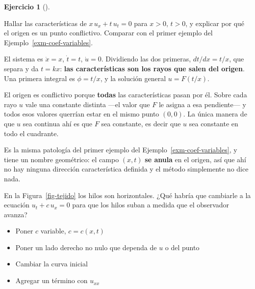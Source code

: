 \documentclass[
  spanish,
  a4paper,
]{scrbook}
\providecommand{\tightlist}{%
  \setlength{\itemsep}{0pt}\setlength{\parskip}{0pt}}
\theoremstyle{definition}
\theoremstyle{plain}
\theoremstyle{definition}
\theoremstyle{plain}
\theoremstyle{definition}
\newtheorem{exercise}{Ejercicio}[chapter]
\theoremstyle{remark}
\begin{document}
\begin{exercise}[]\protect\hypertarget{exr-caracteristicas-variables}{}\label{exr-caracteristicas-variables}

Hallar las características de \(x\,u_x + t\,u_t = 0\) para \(x>0\),
\(t>0\), y explicar por qué el origen es un punto conflictivo. Comparar
con el primer ejemplo del Ejemplo~\ref{exm-coef-variables}.

\end{exercise}

\begin{tcolorbox}[enhanced jigsaw, arc=.35mm, bottomrule=.15mm, bottomtitle=1mm, breakable, colback=white, colbacktitle=quarto-callout-tip-color!10!white, colframe=quarto-callout-tip-color-frame, coltitle=black, left=2mm, leftrule=.75mm, opacityback=0, opacitybacktitle=0.6, rightrule=.15mm, title=\textcolor{quarto-callout-tip-color}{\faLightbulb}\hspace{0.5em}{Solución}, titlerule=0mm, toprule=.15mm, toptitle=1mm]

El sistema es \(\dot x = x\), \(\dot t = t\), \(\dot u = 0\). Dividiendo
las dos primeras, \(dt/dx = t/x\), que separa y da \(t = kx\):
\textbf{las características son los rayos que salen del origen}. Una
primera integral es \(\phi = t/x\), y la solución general
\(u = F(t/x)\).

El origen es conflictivo porque \textbf{todas} las características pasan
por él. Sobre cada rayo \(u\) vale una constante distinta ---el valor
que \(F\) le asigna a esa pendiente--- y todos esos valores querrían
estar en el mismo punto \((0,0)\). La única manera de que \(u\) sea
continua ahí es que \(F\) sea constante, es decir que \(u\) sea
constante en todo el cuadrante.

Es la misma patología del primer ejemplo del
Ejemplo~\ref{exm-coef-variables}, y tiene un nombre geométrico: el campo
\((x,t)\) \textbf{se anula} en el origen, así que ahí no hay ninguna
dirección característica definida y el método simplemente no dice nada.

\end{tcolorbox}

En la Figura~\ref{fig-tejido} los hilos son horizontales. ¿Qué habría
que cambiarle a la ecuación \(u_t + c\,u_x = 0\) para que los hilos
suban a medida que el observador avanza?

\begin{itemize}
\tightlist
\item
  {Poner \(c\) variable, \(c = c(x,t)\)}
\item
  {Poner un lado derecho no nulo que dependa de \(u\) o del punto}
\item
  {Cambiar la curva inicial}
\item
  {Agregar un término con \(u_{xx}\)}
\end{itemize}
\end{document}
